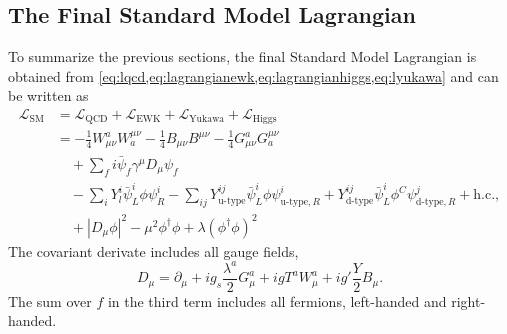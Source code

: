 
\subsection{The Final Standard Model Lagrangian}
\label{subsec:final-lagrangian}
To summarize the previous sections, the final Standard Model Lagrangian is obtained from \cref{eq:lqcd,eq:lagrangianewk,eq:lagrangianhiggs,eq:lyukawa} and can be written as
\begin{align}
  \mathcal{L}_\text{SM} &= \mathcal{L}_\text{QCD} + \mathcal{L}_\text{EWK} + \mathcal{L}_\text{Yukawa} + \mathcal{L}_\text{Higgs} \\
   &= - \frac{1}{4}W_{\mu\nu}^aW^{\mu\nu}_{a} - \frac{1}{4} B_{\mu\nu}B^{\mu\nu} - \frac{1}{4}G_{\mu\nu}^aG^{\mu\nu}_{a} \\
   & \quad + \sum_f i \bar{\psi}_f\gamma^\mu D_\mu\psi_f \\
   & \quad - \sum_{i} Y_l^i \bar{\psi}^{i}_{L} \phi \psi^{i}_{R} - \sum_{ij} Y_{\text{u-type}}^{ij} \bar{\psi}^{i}_{L} \phi \psi^{i}_{\text{u-type},R} + Y_{\text{d-type}}^{ij} \bar{\psi}^{i}_{L} \phi^C \psi^{j}_{\text{d-type}, R} + \text{h.c.},  \\
   & \quad + |D_\mu\phi|^2 - \mu^2\phi^\dagger\phi + \lambda \left(\phi^\dagger\phi \right)^2
\end{align}
The covariant derivate includes all gauge fields,
\begin{equation}
  D_\mu = \partial_\mu + i g_s \frac{\lambda^a}{2} G_\mu^a + igT^aW_\mu^a + ig'\frac{Y}{2}B_\mu.
\end{equation}
The sum over $f$ in the third term includes all fermions, left-handed and right-handed.



